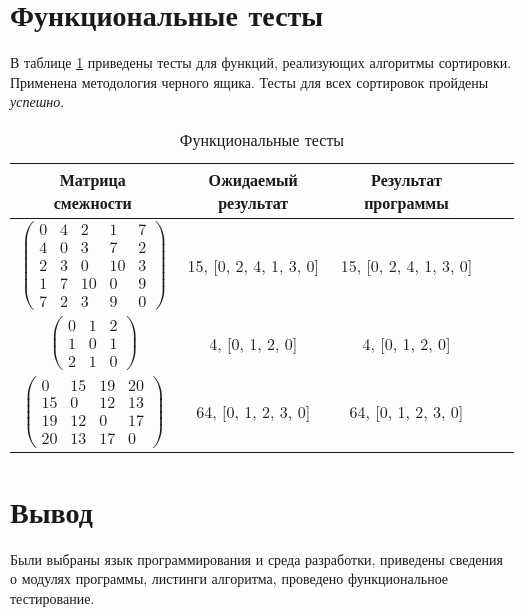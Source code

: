 \section{Функциональные тесты}

В таблице \ref{tbl:functional_test} приведены тесты для функций, реализующих алгоритмы сортировки. Применена методология черного ящика. Тесты для всех сортировок пройдены \textit{успешно}.

\begin{center}
	\captionsetup{justification=raggedright,singlelinecheck=off}
	\begin{longtable}[c]{|c|c|c|c|c|}
		\caption{Функциональные тесты\label{tbl:functional_test}} \\ \hline
		Матрица смежности & Ожидаемый результат & Результат программы \\
		\hline
		$ \begin{pmatrix}
			0 &  4 &  2 &  1 & 7 \\
			4 &  0 &  3 &  7 & 2 \\
			2 &  3 &  0 & 10 & 3 \\
			1 &  7 & 10 &  0 & 9 \\
			7 &  2 &  3 &  9 & 0
		\end{pmatrix}$ &
		15, [0, 2, 4, 1, 3, 0] &
		15, [0, 2, 4, 1, 3, 0] \\
		
		$ \begin{pmatrix}
			0 & 1 & 2 \\
			1 & 0 & 1 \\
			2 & 1 & 0	
		\end{pmatrix}$ &
		4, [0, 1, 2, 0] &
		4, [0, 1, 2, 0] \\
		
		$ \begin{pmatrix}
			0 & 15 & 19 & 20 \\
			15 &  0 & 12 & 13 \\
			19 & 12 &  0 & 17 \\
			20 & 13 & 17 &  0
		\end{pmatrix}$ &
		64, [0, 1, 2, 3, 0] &
		64, [0, 1, 2, 3, 0] \\
		\hline
	\end{longtable}
\end{center}

\section*{Вывод}
Были выбраны язык программирования и среда разработки, приведены сведения о модулях программы, листинги алгоритма, проведено функциональное тестирование.